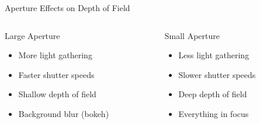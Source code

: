 \begin{frame}{Aperture Effects on Depth of Field}
\begin{center}
    \end{center}

    \vspace{0.5cm}
    \begin{columns}
        \begin{column}{0.5\textwidth}
            \begin{raybox}{Large Aperture}
                \begin{itemize}
                    \item More light gathering
                    \item Faster shutter speeds
                    \item Shallow depth of field
                    \item Background blur (bokeh)
                \end{itemize}
            \end{raybox}
        \end{column}
        \begin{column}{0.5\textwidth}
            \begin{raybox}{Small Aperture}
                \begin{itemize}
                    \item Less light gathering
                    \item Slower shutter speeds
                    \item Deep depth of field
                    \item Everything in focus
                \end{itemize}
            \end{raybox}
        \end{column}
    \end{columns}
\end{frame}

